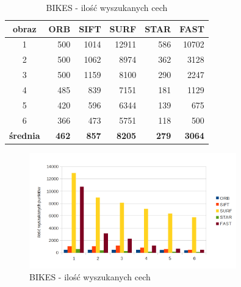 \begin{table}[htbp]
  \centering
  \caption{BIKES - ilość wyszukanych cech}
    \begin{tabular}{|c|r|r|r|r|r|}\hline
    
    obraz & \textbf{ORB} & \textbf{SIFT} & \textbf{SURF} & \textbf{STAR} & \textbf{FAST} \\\hline
    
   
    1 & 500 & 1014 & 12911 & 586 & 10702 \\
    2 & 500 & 1062 & 8974 & 362 & 3128 \\
    3 & 500 & 1159 & 8100 & 290 & 2247 \\
    4 & 485 & 839 & 7151 & 181 & 1129 \\
    5 & 420 & 596 & 6344 & 139 & 675 \\
    6 & 366 & 473 & 5751 & 118 & 500 \\\hline
    \textbf{średnia} & \textbf{462} & \textbf{857} & \textbf{8205} & \textbf{279} & \textbf{3064} \\
    \hline
    \end{tabular}%
  \label{tab:bikes_f1}%
\end{table}%


\begin{figure}
\centering
\includegraphics[width=0.8\textwidth]{pict/mikolajczyk/bikes/F1.png}
\caption{BIKES - ilość wyszukanych cech}
\label{fig:bikes_f1}
\end{figure}


